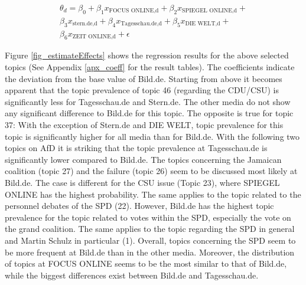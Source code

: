 \documentclass[12pt,a4paper,notitlepage]{article}
\begin{document}
\begin{equation}\label{eq_1}
\begin{split}
	\theta_{d}=\beta_0+\beta_1 x_{\text{FOCUS ONLINE,d}}+\beta_2 x_{\text{SPIEGEL ONLINE,d}}+\\
	\beta_3 x_{\text{stern.de,d}}+\beta_4 x_{\text{Tagesschau.de,d}}+\beta_5 x_{\text{DIE WELT,d}}+\\
	\beta_6 x_{\text{ZEIT ONLINE,d}}+\epsilon
\end{split}
\end{equation}

Figure \ref{fig_estimateEffects} shows the regression results for the above selected topics (See Appendix \ref{apx_coeff} for the result tables). The coefficients indicate the deviation from the base value of Bild.de. Starting from above it becomes apparent that the topic prevalence of topic 46 (regarding the CDU/CSU) is significantly less for Tagesschau.de and Stern.de. The other media do not show any significant difference to Bild.de for this topic. The opposite is true for topic 37: With the exception of Stern.de and DIE WELT, topic prevalence for this topic is significantly higher for all media than for Bild.de. With the following two topics on AfD it is striking that the topic prevalence at Tagesschau.de is significantly lower compared to Bild.de. The topics concerning the Jamaican coalition (topic 27) and the failure (topic 26) seem to be discussed most likely at Bild.de. The case is different for the CSU issue (Topic 23), where SPIEGEL ONLINE has the highest probability. The same applies to the topic related to the personnel debates of the SPD (22). However, Bild.de has the highest topic prevalence for the topic related to votes within the SPD, especially the vote on the grand coalition. The same applies to the topic regarding the SPD in general and Martin Schulz in particular (1). Overall, topics concerning the SPD seem to be more frequent at Bild.de than in the other media. Moreover, the distribution of topics at FOCUS ONLINE seems to be the most similar to that of Bild.de, while the biggest differences exist between Bild.de and Tagesschau.de. 
\end{document}
